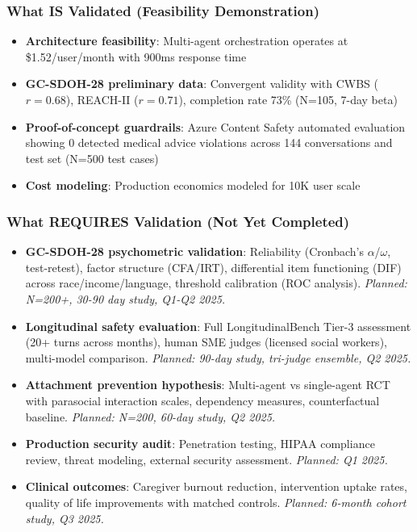 \documentclass{article}
\begin{document}
\subsubsection{What IS Validated (Feasibility Demonstration)}

\begin{itemize}
    \item \textbf{Architecture feasibility}: Multi-agent orchestration operates at \$1.52/user/month with 900ms response time
    \item \textbf{GC-SDOH-28 preliminary data}: Convergent validity with CWBS ($r=0.68$), REACH-II ($r=0.71$), completion rate 73\% (N=105, 7-day beta)
    \item \textbf{Proof-of-concept guardrails}: Azure Content Safety automated evaluation showing 0 detected medical advice violations across 144 conversations and test set (N=500 test cases)
    \item \textbf{Cost modeling}: Production economics modeled for 10K user scale
\end{itemize}

\subsubsection{What REQUIRES Validation (Not Yet Completed)}

\begin{itemize}
    \item \textbf{GC-SDOH-28 psychometric validation}: Reliability (Cronbach's $\alpha$/$\omega$, test-retest), factor structure (CFA/IRT), differential item functioning (DIF) across race/income/language, threshold calibration (ROC analysis). \textit{Planned: N=200+, 30-90 day study, Q1-Q2 2025.}
    \item \textbf{Longitudinal safety evaluation}: Full LongitudinalBench Tier-3 assessment (20+ turns across months), human SME judges (licensed social workers), multi-model comparison. \textit{Planned: 90-day study, tri-judge ensemble, Q2 2025.}
    \item \textbf{Attachment prevention hypothesis}: Multi-agent vs single-agent RCT with parasocial interaction scales, dependency measures, counterfactual baseline. \textit{Planned: N=200, 60-day study, Q2 2025.}
    \item \textbf{Production security audit}: Penetration testing, HIPAA compliance review, threat modeling, external security assessment. \textit{Planned: Q1 2025.}
    \item \textbf{Clinical outcomes}: Caregiver burnout reduction, intervention uptake rates, quality of life improvements with matched controls. \textit{Planned: 6-month cohort study, Q3 2025.}
\end{itemize}
\end{document}

